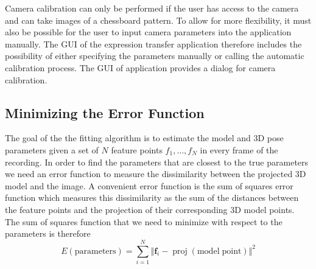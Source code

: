 \documentclass[11pt,a4paper,twoside]{report}
\begin{document}
Camera calibration can only be performed if the
user has access to the camera and can take images of a chessboard pattern. To
allow for more flexibility, it must also be possible for the user to
input camera parameters into the application manually. The GUI of the expression
transfer application therefore includes the possibility of either specifying the
parameters manually or calling the automatic calibration process. The GUI of
application provides a dialog for camera calibration. 

\subsection{Minimizing the Error Function}\label{s:minerror}
The goal of the the fitting algorithm is to estimate the model and 3D pose
parameters given a set of $N$ feature points $f_1, \ldots , f_N$ in every frame of the recording. In
order to find the parameters that are closest to the true parameters we need an error
function to measure the dissimilarity between the projected 3D model and
the image. A convenient error function is the sum of squares error function
which measures this dissimilarity as the
sum of the distances between the feature points and the
projection of their corresponding 3D model points. The sum of squares
function that we need to minimize with respect to the parameters is therefore
\begin{equation}\label{eq:fit0}
E(\mathrm{parameters}) = \sum_{i=1}^N \Big\Vert\mathbf{f}_i - \mathop{proj}(\mathrm{model\; point})\Big\Vert^2
\end{equation}
\end{document}
